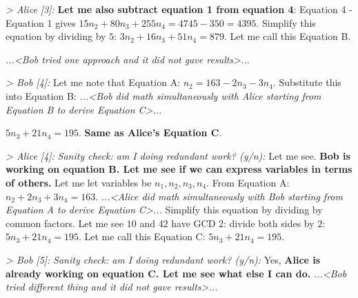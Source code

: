\textit{> Alice [3]:}  \textbf{Let me also subtract equation 1 from equation 4}: Equation 4 - Equation 1 gives $15n_2 +80n_3 +255n_4 =4745-350=4395$. Simplify this equation by dividing by $5$: $3n_2 +16n_3 +51n_4=879$. Let me call this Equation B.

\textit{...<Bob tried one approach and it did not gave results>...}

\textit{> Bob [4]:}  Let me note that Equation A: $n_2 =163 -2n_3 -3n_4$. Substitute this into Equation B: 
\textit{...<Bob did math simultaneously with Alice starting from Equation B to derive Equation C>...}


$5n_3 +21n_4=195$. \textbf{Same as Alice's Equation C}.

\textit{> Alice [4]:} \textit{Sanity check: am I doing redundant work? (y/n):} Let me see. \textbf{Bob is working on equation B. Let me see if we can express variables in terms of others.} Let me let variables be $n_1,n_2,n_3,n_4$. From Equation A: $n_2 +2n_3 +3n_4 =163$. \textit{...<Alice did math simultaneously with Bob starting from Equation A to derive Equation C>...}
Simplify this equation by dividing by common factors. Let me see $10$ and $42$ have GCD $2$: divide both sides by $2$: $5n_3 +21n_4=195$. Let me call this Equation C: $5n_3 +21n_4=195$.

\textit{> Bob [5]:} \textit{Sanity check: am I doing redundant work? (y/n):} Yes, \textbf{Alice is already working on equation C. Let me see what else I can do.} 
\textit{...<Bob tried different thing and it did not gave results>...}


